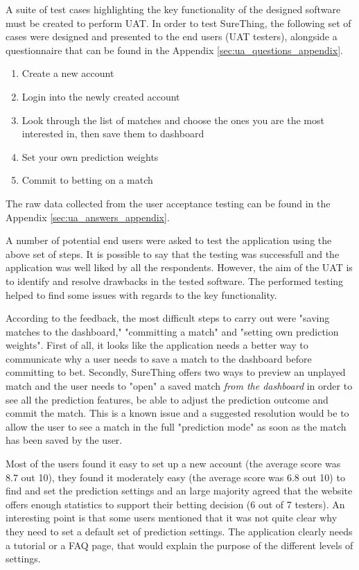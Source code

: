 A suite of test cases highlighting the key functionality of the designed software must be created to perform UAT. In order to test SureThing, the following set of cases were designed and presented to the end users (UAT testers), alongside a questionnaire that can be found in the Appendix \ref{sec:ua_questions_appendix}.

\begin{enumerate}
  \item Create a new account
  \item Login into the newly created account
  \item Look through the list of matches and choose the ones you are the most interested in, then save them to dashboard
  \item Set your own prediction weights
  \item Commit to betting on a match
\end{enumerate}

The raw data collected from the user acceptance testing can be found in the Appendix \ref{sec:ua_answers_appendix}.

A number of potential end users were asked to test the application using the above set of steps. It is possible to say that the testing was successfull and the application was well liked by all the respondents. However, the aim of the UAT is to identify and resolve drawbacks in the tested software. The performed testing helped to find some issues with regards to the key functionality.

According to the feedback, the most difficult steps to carry out were "saving matches to the dashboard," "committing a match" and "setting own prediction weights". First of all, it looks like the application needs a better way to communicate why a user needs to save a match to the dashboard before committing to bet. Secondly, SureThing offers two ways to preview an unplayed match and the user needs to "open" a saved match \emph{from the dashboard} in order to see all the prediction features, be able to adjust the prediction outcome and commit the match. This is a known issue and a suggested resolution would be to allow the user to see a match in the full "prediction mode" as soon as the match has been saved by the user.

Most of the users found it easy to set up a new account (the average score was 8.7 out 10), they found it moderately easy (the average score was 6.8 out 10) to find and set the prediction settings and an large majority agreed that the website offers enough statistics to support their betting decision (6 out of 7 testers). An interesting point is that some users mentioned that it was not quite clear why they need to set a default set of prediction settings. The application clearly needs a tutorial or a FAQ page, that would explain the purpose of the different levels of settings.

